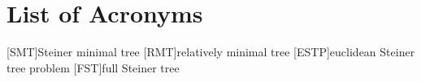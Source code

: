 {
\abnormalparskip{0pt}
\chapter{List of Acronyms}
}

\begin{acronym}
  [SMT]{Steiner minimal tree}
  [RMT]{relatively minimal tree}
  [ESTP]{euclidean Steiner tree problem}
  [FST]{full Steiner tree}
\end{acronym}

